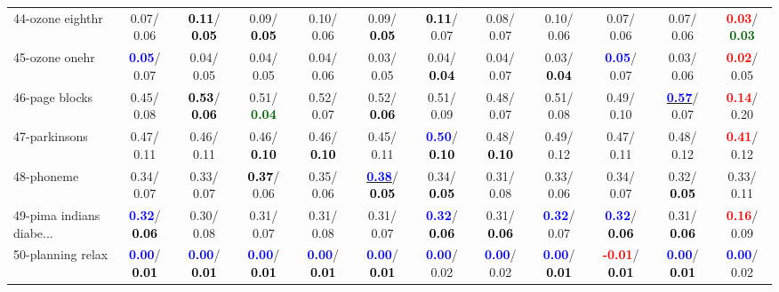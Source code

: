 \begin{table}[h]
\begin{center}
{\begin{tabular}{lc|c|c|c|c|c|c|c|c|c|c}
44-ozone eighthr &   0.07/  0.06 & \textcolor{black}{\textbf{  0.11}}/\textcolor{black}{\textbf{  0.05}} &   0.09/\textcolor{black}{\textbf{  0.05}} &   0.10/  0.06 &   0.09/\textcolor{black}{\textbf{  0.05}} & \textcolor{black}{\textbf{  0.11}}/  0.07 &   0.08/  0.07 &   0.10/  0.06 &   0.07/  0.06 &   0.07/  0.06 & \textcolor{red}{\textbf{  0.03}}/\textcolor{darkgreen}{\textbf{  0.03}} \\
45-ozone onehr & \textcolor{blue}{\textbf{  0.05}}/  0.07 &   0.04/  0.05 &   0.04/  0.05 &   0.04/  0.06 &   0.03/  0.05 &   0.04/\textcolor{black}{\textbf{  0.04}} &   0.04/  0.07 &   0.03/\textcolor{black}{\textbf{  0.04}} & \textcolor{blue}{\textbf{  0.05}}/  0.07 &   0.03/  0.06 & \textcolor{red}{\textbf{  0.02}}/  0.05 \\
46-page blocks &   0.45/  0.08 & \textcolor{black}{\textbf{  0.53}}/\textcolor{black}{\textbf{  0.06}} &   0.51/\textcolor{darkgreen}{\textbf{  0.04}} &   0.52/  0.07 &   0.52/\textcolor{black}{\textbf{  0.06}} &   0.51/  0.09 &   0.48/  0.07 &   0.51/  0.08 &   0.49/  0.10 & \underline{\textcolor{blue}{\textbf{  0.57}}}/  0.07 & \textcolor{red}{\textbf{  0.14}}/  0.20 \\ \hline
47-parkinsons &   0.47/  0.11 &   0.46/  0.11 &   0.46/\textcolor{black}{\textbf{  0.10}} &   0.46/\textcolor{black}{\textbf{  0.10}} &   0.45/  0.11 & \textcolor{blue}{\textbf{  0.50}}/\textcolor{black}{\textbf{  0.10}} &   0.48/\textcolor{black}{\textbf{  0.10}} &   0.49/  0.12 &   0.47/  0.11 &   0.48/  0.12 & \textcolor{red}{\textbf{  0.41}}/  0.12 \\
48-phoneme &   0.34/  0.07 &   0.33/  0.07 & \textcolor{black}{\textbf{  0.37}}/  0.06 &   0.35/  0.06 & \underline{\textcolor{blue}{\textbf{  0.38}}}/\textcolor{black}{\textbf{  0.05}} &   0.34/\textcolor{black}{\textbf{  0.05}} &   0.31/  0.08 &   0.33/  0.06 &   0.34/  0.07 &   0.32/\textcolor{black}{\textbf{  0.05}} &   0.33/  0.11 \\
49-pima indians diabe... & \textcolor{blue}{\textbf{  0.32}}/\textcolor{black}{\textbf{  0.06}} &   0.30/  0.08 &   0.31/  0.07 &   0.31/  0.08 &   0.31/  0.07 & \textcolor{blue}{\textbf{  0.32}}/\textcolor{black}{\textbf{  0.06}} &   0.31/\textcolor{black}{\textbf{  0.06}} & \textcolor{blue}{\textbf{  0.32}}/  0.07 & \textcolor{blue}{\textbf{  0.32}}/\textcolor{black}{\textbf{  0.06}} &   0.31/\textcolor{black}{\textbf{  0.06}} & \textcolor{red}{\textbf{  0.16}}/  0.09 \\
50-planning relax & \textcolor{blue}{\textbf{  0.00}}/\textcolor{black}{\textbf{  0.01}} & \textcolor{blue}{\textbf{  0.00}}/\textcolor{black}{\textbf{  0.01}} & \textcolor{blue}{\textbf{  0.00}}/\textcolor{black}{\textbf{  0.01}} & \textcolor{blue}{\textbf{  0.00}}/\textcolor{black}{\textbf{  0.01}} & \textcolor{blue}{\textbf{  0.00}}/\textcolor{black}{\textbf{  0.01}} & \textcolor{blue}{\textbf{  0.00}}/  0.02 & \textcolor{blue}{\textbf{  0.00}}/  0.02 & \textcolor{blue}{\textbf{  0.00}}/\textcolor{black}{\textbf{  0.01}} & \textcolor{red}{\textbf{ -0.01}}/\textcolor{black}{\textbf{  0.01}} & \textcolor{blue}{\textbf{  0.00}}/\textcolor{black}{\textbf{  0.01}} & \textcolor{blue}{\textbf{  0.00}}/  0.02 \\

\end{tabular}}
\end{center}
\end{table}
